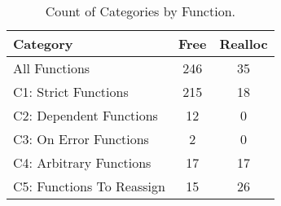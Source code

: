\begin{table}[H]
   \begin{center}
   \begin{tabularx}{0.6\linewidth}{l|c|c}

      Category & Free & Realloc \\
      \hline

      All Functions& 246 & 35 \\

      C1: Strict Functions& 215 & 18 \\

      C2: Dependent Functions& 12 & 0 \\

      C3: On Error Functions& 2 & 0 \\

      C4: Arbitrary Functions& 17 & 17 \\

      C5: Functions To Reassign& 15 & 26 \\

   \end{tabularx}
\end{center}
   \caption{Count of Categories by Function.}
   \label{tab:categories:overview}
\end{table}

